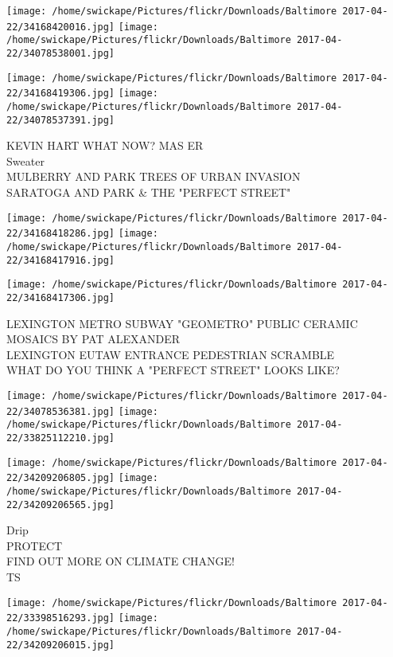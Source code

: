 \documentclass[10pt,letterpaper]{article}
\begin{document}
\texttt{[image: /home/swickape/Pictures/flickr/Downloads/Baltimore 2017-04-22/34168420016.jpg]}
\texttt{[image: /home/swickape/Pictures/flickr/Downloads/Baltimore 2017-04-22/34078538001.jpg]}

\texttt{[image: /home/swickape/Pictures/flickr/Downloads/Baltimore 2017-04-22/34168419306.jpg]}
\texttt{[image: /home/swickape/Pictures/flickr/Downloads/Baltimore 2017-04-22/34078537391.jpg]}

KEVIN HART WHAT NOW?  MAS ER\\
Sweater\\
MULBERRY AND PARK TREES OF URBAN INVASION\\
SARATOGA AND PARK \& THE "PERFECT STREET"
\pagebreak

\texttt{[image: /home/swickape/Pictures/flickr/Downloads/Baltimore 2017-04-22/34168418286.jpg]}
\texttt{[image: /home/swickape/Pictures/flickr/Downloads/Baltimore 2017-04-22/34168417916.jpg]}

\vspace{0.25in}
\texttt{[image: /home/swickape/Pictures/flickr/Downloads/Baltimore 2017-04-22/34168417306.jpg]}

LEXINGTON METRO SUBWAY "GEOMETRO" PUBLIC CERAMIC MOSAICS BY PAT ALEXANDER\\
LEXINGTON EUTAW ENTRANCE PEDESTRIAN SCRAMBLE\\
WHAT DO YOU THINK A "PERFECT STREET" LOOKS LIKE?
\pagebreak

\texttt{[image: /home/swickape/Pictures/flickr/Downloads/Baltimore 2017-04-22/34078536381.jpg]}
\texttt{[image: /home/swickape/Pictures/flickr/Downloads/Baltimore 2017-04-22/33825112210.jpg]}

\texttt{[image: /home/swickape/Pictures/flickr/Downloads/Baltimore 2017-04-22/34209206805.jpg]}
\texttt{[image: /home/swickape/Pictures/flickr/Downloads/Baltimore 2017-04-22/34209206565.jpg]}

Drip\\
PROTECT\\
FIND OUT MORE ON CLIMATE CHANGE!\\
TS
\pagebreak

\texttt{[image: /home/swickape/Pictures/flickr/Downloads/Baltimore 2017-04-22/33398516293.jpg]}
\texttt{[image: /home/swickape/Pictures/flickr/Downloads/Baltimore 2017-04-22/34209206015.jpg]}
\end{document}
